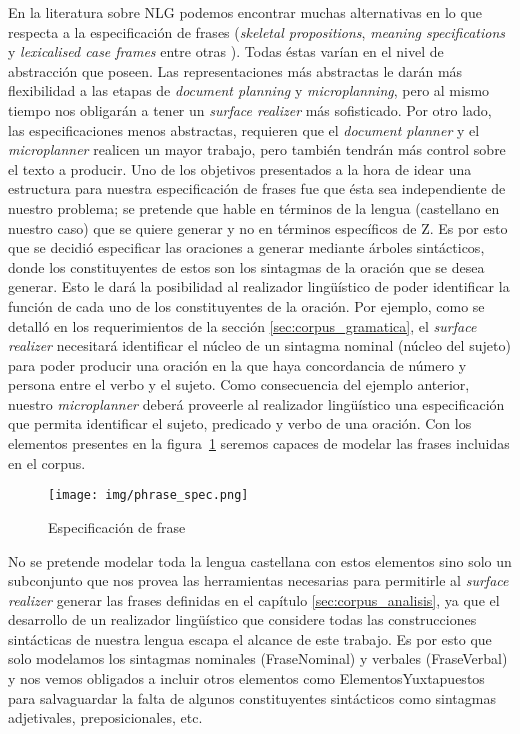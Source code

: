 En la literatura sobre NLG podemos encontrar muchas alternativas en lo que respecta a la especificación de frases (\textit{skeletal propositions}, \textit{meaning specifications} y \textit{lexicalised case frames} entre otras \cite{reiter_dale}). Todas éstas varían en el nivel de abstracción que poseen. Las representaciones más abstractas le darán más flexibilidad a las etapas de \textit{document planning} y \textit{microplanning}, pero al mismo tiempo nos obligarán a tener un \textit{surface realizer} más sofisticado. Por otro lado, las especificaciones menos abstractas, requieren que el \textit{document planner} y el \textit{microplanner} realicen un mayor trabajo, pero también tendrán más control sobre el texto a producir. Uno de los objetivos presentados a la hora de idear una estructura para nuestra especificación de frases fue que ésta sea independiente de nuestro problema; se pretende que hable en términos de la lengua (castellano en nuestro caso) que se quiere generar y no en términos específicos de Z. Es por esto que se decidió especificar las oraciones a generar mediante árboles sintácticos, donde los constituyentes de estos son los sintagmas de la oración que se desea generar. Esto le dará la posibilidad al realizador lingüístico de poder identificar la función de cada uno de los constituyentes de la oración. Por ejemplo, como se detalló en los requerimientos de la sección \ref{sec:corpus_gramatica}, el \textit{surface realizer} necesitará identificar el núcleo de un sintagma nominal (núcleo del sujeto) para poder producir una oración en la que haya concordancia de número y persona entre el verbo y el sujeto. Como consecuencia del ejemplo anterior, nuestro \textit{microplanner} deberá proveerle al realizador lingüístico una especificación que permita identificar el sujeto, predicado y verbo de una oración. Con los elementos presentes en la figura~\ref{fig:phase_spec} seremos capaces de modelar las frases incluidas en el corpus.

\begin{figure}[h]
  	\centering
	\texttt{[image: img/phrase\_spec.png]}
	\caption{Especificación de frase}
  	\label{fig:phase_spec}
\end{figure}

No se pretende modelar toda la lengua castellana con estos elementos sino solo un subconjunto que nos provea las herramientas necesarias para permitirle al \textit{surface realizer} generar las frases definidas en el capítulo \ref{sec:corpus_analisis}, ya que el desarrollo de un realizador lingüístico que considere todas las construcciones sintácticas de nuestra lengua escapa el alcance de este trabajo. Es por esto que solo modelamos los sintagmas nominales (FraseNominal) y verbales (FraseVerbal) y nos vemos obligados a incluir otros elementos como ElementosYuxtapuestos para salvaguardar la falta de algunos constituyentes sintácticos como sintagmas adjetivales, preposicionales, etc. 

